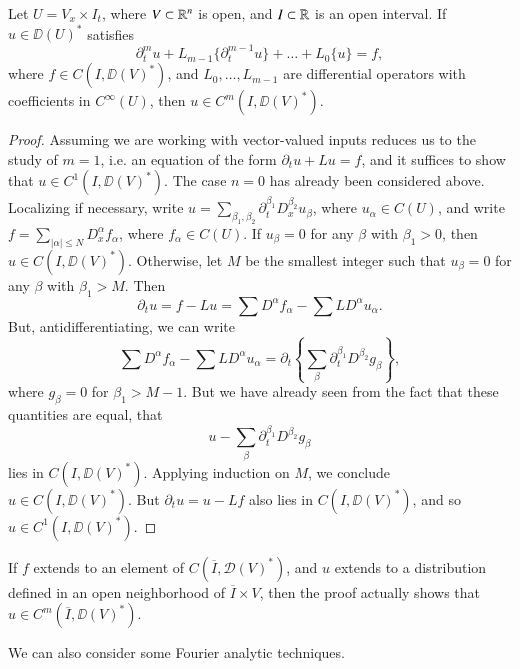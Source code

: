 \begin{theorem}
    Let $U = V_x \times I_t$, where $V \subset \operatorname{\mathbb{R}}^n$ is open, and $I \subset \operatorname{\mathbb{R}}$ is an open interval. If $u \in \DD(U)^*$ satisfies
    \[ \partial_t^m u + L_{m-1} \{ \partial_t^{m-1} u \} + \dots + L_0 \{ u \} = f, \]
    where $f \in C(I, \DD(V)^*)$, and $L_0,\dots,L_{m-1}$ are differential operators with coefficients in $C^\infty(U)$, then $u \in C^m(I,\DD(V)^*)$.
\end{theorem}
\begin{proof}
    Assuming we are working with vector-valued inputs reduces us to the study of $m = 1$, i.e. an equation of the form $\partial_t u + Lu = f$, and it suffices to show that $u \in C^1(I,\DD(V)^*)$. The case $n = 0$ has already been considered above. Localizing if necessary, write $u = \sum_{\beta_1,\beta_2} \partial_t^{\beta_1} D^{\beta_2}_x u_\beta$, where $u_\alpha \in C(U)$, and write $f = \sum_{|\alpha| \leq N} D^\alpha_x f_\alpha$, where $f_\alpha \in C(U)$. If $u_\beta = 0$ for any $\beta$ with $\beta_1 > 0$, then $u \in C(I, \DD(V)^*)$. Otherwise, let $M$ be the smallest integer such that $u_\beta = 0$ for any $\beta$ with $\beta_1 > M$. Then
    \[ \partial_t u = f - Lu = \sum D^\alpha f_\alpha - \sum L D^\alpha u_\alpha. \]
    But, antidifferentiating, we can write
    \[ \sum D^\alpha f_\alpha - \sum L D^\alpha u_\alpha = \partial_t \left\{ \sum_\beta \partial_t^{\beta_1} D^{\beta_2} g_\beta \right\}, \]
    where $g_\beta = 0$ for $\beta_1 > M-1$. But we have already seen from the fact that these quantities are equal, that
    \[ u - \sum_\beta \partial_t^{\beta_1} D^{\beta_2} g_\beta \]
    lies in $C(I,\DD(V)^*)$. Applying induction on $M$, we conclude $u \in C(I,\DD(V)^*)$. But $\partial_t u = u - Lf$ also lies in $C(I,\DD(V)^*)$, and so $u \in C^1(I,\DD(V)^*)$.
\end{proof}

\begin{remark}
    If $f$ extends to an element of $C(\overline{I}, \mathcal{D}(V)^*)$, and $u$ extends to a distribution defined in an open neighborhood of $\overline{I} \times V$, then the proof actually shows that $u \in C^m(\overline{I}, \DD(V)^*)$.
\end{remark}

We can also consider some Fourier analytic techniques.

